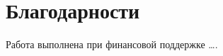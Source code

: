\chapter*{Благодарности}
\label{chap:ack}

\lipsum[13]

\vspace*{1.5cm}

Работа выполнена при  финансовой поддержке \dots. 

\vfill\hfill{\tiny \textcolor{black!20!white}{\texttt{\GitDescribe}}}
